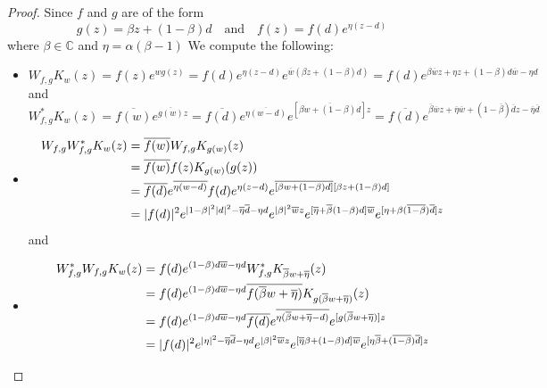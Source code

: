 \documentclass[reqno]{amsart}
\theoremstyle{remark}
\theoremstyle{Definition}
\theoremstyle{remark}
\numberwithin{equation}{section}
\begin{document}
\begin{proof} Since $f$ and $g$ are of the form
\begin{equation}\label{e1}
  g(z)= \beta z+ (1-\beta) d \text{~~ and ~~} f(z)= f(d) e^{\eta(z-d)}  
\end{equation}
where  $\beta \in \mathbb{C}$ and $ \eta = \alpha (\beta -1)$ We compute the following:
\begin{itemize}
\item[{(a)}]
\begin{equation*}
        W_{f,g}K_{w}(z)=f(z)e^{wg(z)}= f(d)e^{\eta(z-d)}e^{\overline{w}( \beta z+ (1-\beta) d)}= f(d) e^{ \beta \overline{w}z+\eta z+(1-\beta)d \overline{w}-\eta d}
    \end{equation*}
    and
\begin{equation*}
    W^{*}_{f,g}K_{w}(z)=\overline{f(w)}e^{\overline{g(w)}z}=\overline{f(d)}e^{\overline{\eta(w-d)}}e^{[\overline{\beta w+ (1-\beta) d}]z}= \overline{f(d)}e^{\overline{\beta}\overline{w}z+\overline{\eta}\overline{w}+(1-\overline{\beta}) \overline{d}z- \overline{\eta}\overline{d}}
\end{equation*}

    
    \item[{(b)}] \begin{align}
       W_{f,g}W^{*}_{f,g}K_{w}(z)&= \overline{f(w)}W_{f,g}K_{g(w)}(z)\notag\\
       &=\overline{f(w)}f(z)K_{g(w)}(g(z))\notag\\
       &= \overline{f(d)}e^{\overline{\eta(w-d)}}f(d)e^{\eta(z-d)}e^{\overline{[\beta w+(1-\beta)d]}[\beta z+(1-\beta)d]} \notag\\
       &= |f(d)|^{2}e^{|1-\beta|^{2}|d|^{2}-\overline{\eta}\overline{d}-\eta d}e^{|\beta|^{2}\overline{w}z} e^{[\overline{\eta}+\overline{\beta}(1-\beta)d]\overline{w}}e^{[\eta+\beta(\overline{1-\beta})\overline{d}]z}
    \end{align}
and

\item[{(c)}] \begin{align}
    W^{*}_{f,g}W_{f,g}K_{w}(z)&= f(d)e^{(1-\beta)d\overline{w}-\eta d}W^{*}_{f,g} K_{\overline{\beta}w+\overline{\eta}}(z)\notag\\
    &= f(d)e^{(1-\beta)d\overline{w}-\eta d} \overline{f(\overline{\beta}w+\overline{\eta})}K_{g(\overline{\beta}w+\overline{\eta})}(z)\notag\\
    &= f(d)e^{(1-\beta)d\overline{w}-\eta d}\overline{f(d)}e^{\overline{\eta(\overline{\beta}w+\overline{\eta}-d)}}e^{[g(\overline{\beta}w+\overline{\eta})]z}\notag\\
    &= |f(d)|^{2}e^{|\eta|^{2}-\overline{\eta}\overline{d}-\eta d}e^{|\beta|^{2}\overline{w}z} e^{[\overline{\eta}\beta+(1-\beta)d]\overline{w}}e^{[\eta\overline{\beta}+(\overline{1-\beta})\overline{d}]z}
\end{align}
  \end{itemize}  
\end{proof}
\end{document}

